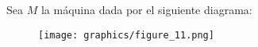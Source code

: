 \begin{frame}
  \begin{block}{}
    \PN Sea $M$ la máquina dada por el siguiente diagrama:
  \end{block}
    \begin{figure}[h]
      \centering
      \texttt{[image: graphics/figure\_11.png]}
    \end{figure}
\end{frame}
